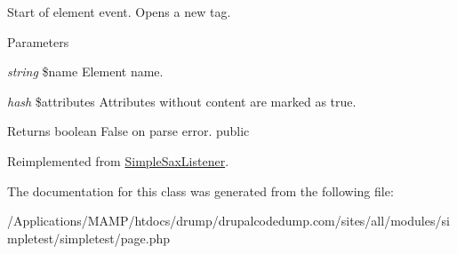 \label{class_simple_page_builder_a7b40a556918f88bd570eed376ad36b7e}
Start of element event. Opens a new tag. 
\begin{DoxyParams}{Parameters}
\item[{\em string}]\$name Element name. \item[{\em hash}]\$attributes Attributes without content are marked as true. \end{DoxyParams}
\begin{DoxyReturn}{Returns}
boolean False on parse error.  public 
\end{DoxyReturn}


Reimplemented from \hyperlink{class_simple_sax_listener_a9094543df0d68dfa168c08087f8c868f}{SimpleSaxListener}.

The documentation for this class was generated from the following file:\begin{DoxyCompactItemize}
\item 
/Applications/MAMP/htdocs/drump/drupalcodedump.com/sites/all/modules/simpletest/simpletest/page.php\end{DoxyCompactItemize}
